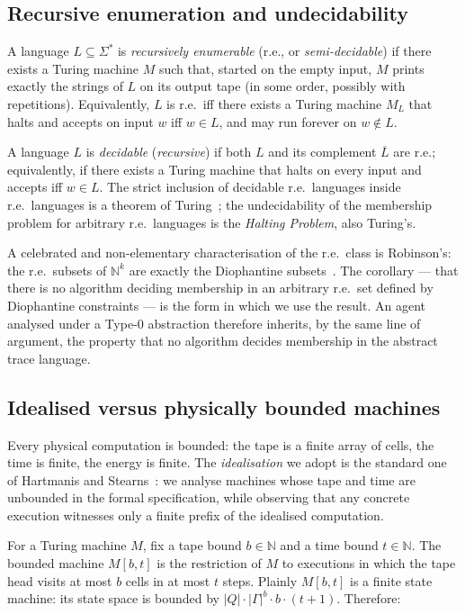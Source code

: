\subsection{Recursive enumeration and undecidability}

A language $L\subseteq \Sigma^*$ is \emph{recursively enumerable}
(r.e., or \emph{semi-decidable}) if there exists a Turing machine
$M$ such that, started on the empty input, $M$ prints exactly the
strings of $L$ on its output tape (in some order, possibly with
repetitions).  Equivalently, $L$ is r.e.\ iff there exists a Turing
machine $M_L$ that halts and accepts on input $w$ iff $w\in L$,
and may run forever on $w\notin L$.

A language $L$ is \emph{decidable} (\emph{recursive}) if both $L$
and its complement $\overline{L}$ are r.e.; equivalently, if there
exists a Turing machine that halts on every input and accepts iff
$w\in L$.  The strict inclusion of decidable r.e.\ languages
inside r.e.\ languages is a theorem of
Turing~\cite{turing1936computable}; the undecidability of the
membership problem for arbitrary r.e.\ languages is the
\emph{Halting Problem}, also Turing's.

A celebrated and non-elementary characterisation of the r.e.\ class
is Robinson's:  the r.e.\ subsets of $\mathbb{N}^k$ are exactly the
Diophantine subsets~\cite{robinson1949definability,davis1961decision}.
The corollary --- that there is no algorithm deciding membership
in an arbitrary r.e.\ set defined by Diophantine constraints ---
is the form in which we use the result.  An agent analysed under a Type-0 abstraction therefore inherits,
by the same line of argument, the property that no algorithm decides
membership in the abstract trace language.

\subsection{Idealised versus physically bounded machines}

Every physical computation is bounded: the tape is a finite array
of cells, the time is finite, the energy is finite.  The
\emph{idealisation} we adopt is the standard one of
Hartmanis and Stearns~\cite{hartmanis1965computational}: we
analyse machines whose tape and time are unbounded in the formal
specification, while observing that any concrete execution
witnesses only a finite prefix of the idealised computation.

For a Turing machine $M$, fix a tape bound $b\in\mathbb{N}$ and a
time bound $t\in\mathbb{N}$.  The bounded machine $M[b,t]$ is the
restriction of $M$ to executions in which the tape head visits at
most $b$ cells in at most $t$ steps.  Plainly $M[b,t]$ is a finite
state machine: its state space is bounded by $|Q|\cdot
|\Gamma|^b\cdot b\cdot (t+1)$.  Therefore:

